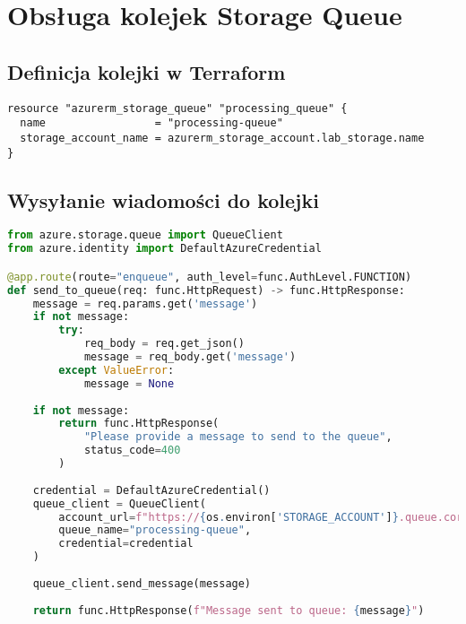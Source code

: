 \documentclass{article}
\begin{document}
\section{Obsługa kolejek Storage Queue}
\subsection{Definicja kolejki w Terraform}
\begin{lstlisting}[]
resource "azurerm_storage_queue" "processing_queue" {
  name                 = "processing-queue"
  storage_account_name = azurerm_storage_account.lab_storage.name
}
\end{lstlisting}

\subsection{Wysyłanie wiadomości do kolejki}
\begin{lstlisting}[language=python]
from azure.storage.queue import QueueClient
from azure.identity import DefaultAzureCredential

@app.route(route="enqueue", auth_level=func.AuthLevel.FUNCTION)
def send_to_queue(req: func.HttpRequest) -> func.HttpResponse:
    message = req.params.get('message')
    if not message:
        try:
            req_body = req.get_json()
            message = req_body.get('message')
        except ValueError:
            message = None
    
    if not message:
        return func.HttpResponse(
            "Please provide a message to send to the queue",
            status_code=400
        )
    
    credential = DefaultAzureCredential()
    queue_client = QueueClient(
        account_url=f"https://{os.environ['STORAGE_ACCOUNT']}.queue.core.windows.net",
        queue_name="processing-queue",
        credential=credential
    )
    
    queue_client.send_message(message)
    
    return func.HttpResponse(f"Message sent to queue: {message}")
\end{lstlisting}
\end{document}
